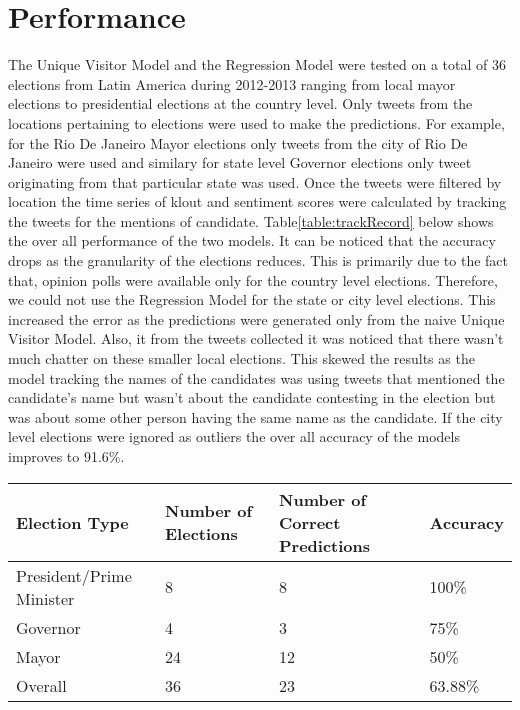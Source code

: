\section{Performance}
The Unique Visitor Model and the Regression Model were tested on a total of 36 elections from Latin America during 2012-2013 ranging from local mayor elections to presidential elections at the country level.
Only tweets from the locations pertaining to elections were used to make the predictions.
For example, for the Rio De Janeiro Mayor elections only tweets from the city of Rio De Janeiro were used and similary for state level Governor elections only tweet originating from that particular state was used.
Once the tweets were filtered by location the time series of klout and sentiment scores were calculated by tracking the tweets for the mentions of candidate.
Table\ref{table:trackRecord} below shows the over all performance of the two models. 
It can be noticed that the accuracy drops as the granularity of the elections reduces. 
This is primarily due to the fact that, opinion polls were available only for the country level elections.
Therefore, we could not use the Regression Model for the state or city level elections.
This increased the error as the predictions were generated only from the naive Unique Visitor Model.
Also, it from the tweets collected it was noticed that there wasn't much chatter on these smaller local elections.
This skewed the results as the model tracking the names of the candidates was using tweets that mentioned the candidate's name but wasn't about the candidate contesting in the election but was about some other person having the same name as the candidate.
If the city level elections were ignored as outliers the over all accuracy of the models improves to 91.6\%.

\begin{table*}
        \centering
        \begin{tabular}{| l | l | l | l |}
        \hline
        Election Type & Number of Elections & Number of Correct Predictions & Accuracy\\
        \hline
        President/Prime Minister & 8 & 8 & 100\%\\
        Governor & 4 & 3 & 75\%\\
        Mayor & 24 & 12 & 50\%\\
        Overall & 36 & 23 & 63.88\%\\
        \hline
        \end{tabular}
        \vspace{-0.5em}
        \caption{Track Record of Prediction Algorithms}
        \label{table:trackRecord}
        \vspace{-0.5em}
\end{table*}
